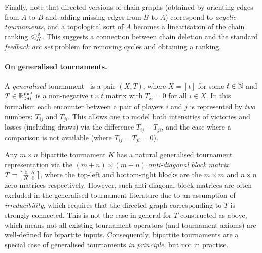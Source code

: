 Finally, note that directed versions of chain graphs (obtained by orienting
edges from $A$ to $B$ and adding missing edges from $B$ to $A$) correspond to
\emph{acyclic tournaments}, and a topological sort of $A$ becomes a
linearisation of the chain ranking $\leqslant^{\mathcal{A}}_K$. This suggests a connection
between chain deletion and the standard \emph{feedback arc set} problem for
removing cycles and obtaining a ranking.

\paragraph{On generalised tournaments.}
%
A \emph{generalised} tournament~\cite{gonzalez2014paired} is a pair $(X, T)$,
where $X = [t]$ for some $t \in \mathbb{N}$ and $T \in \mathbb{R}_{\ge 0}^{t \times t}$ is a
non-negative $t \times t$ matrix with $T_{ii} = 0$ for all $i \in X$. In this
formalism each encounter between a pair of players $i$ and $j$ is represented
by \emph{two} numbers: $T_{ij}$ and $T_{ji}$. This allows one to model both
intensities of victories and losses (including draws) via the difference
$T_{ij} - T_{ji}$, and the case where a comparison is not available (where
$T_{ij} = T_{ji} = 0$).

Any $m \times n$ bipartite tournament $K$ has a natural generalised tournament
representation via the $(m + n) \times (m + n)$ \emph{anti-diagonal block
matrix}
$
    T = \left[\begin{smallmatrix}
        0 & K \\
        {\overline{K}} & 0
    \end{smallmatrix}\right]
$, where the top-left and bottom-right blocks are the $m \times m$ and $n
\times n$ zero matrices respectively.  However, such anti-diagonal block
matrices are often excluded in the generalised tournament literature due to an
assumption of \emph{irreducibility}, which requires that the directed graph
corresponding to $T$ is strongly connected. This is not the case in general for
$T$ constructed as above, which means not all existing tournament
operators (and tournament axioms) are well-defined for bipartite
inputs.\footnotemark{} Consequently, bipartite tournaments are a special case
of generalised tournaments \emph{in principle}, but not in practise.


